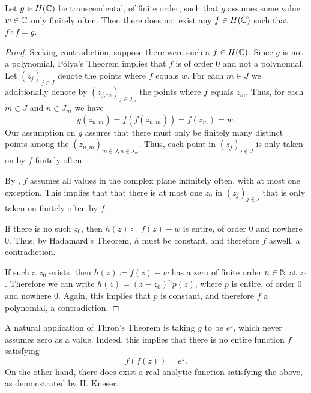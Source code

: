 \begin{theorem}[Thron] \label{thm:thron}
    Let $g \in H(\mathbb{C})$ be transcendental, of finite order, such that $g$ assumes some value $w \in \mathbb{C}$ only finitely often. Then there does not exist any $f \in H(\mathbb{C})$ such that $f \circ f = g$.
\end{theorem}

\begin{proof}
    Seeking contradiction, suppose there were such a $f \in H(\mathbb{C})$. Since $g$ is not a polynomial, Pólya's Theorem implies that $f$ is of order $0$ and not a polynomial. Let $(z_j)_{j \in J}$ denote the points where $f$ equals $w$. For each $m \in J$ we additionally denote by $(z_{j,m})_{j \in J_m}$ the points where $f$ equals $z_m$. Thus, for each $m \in J$ and $n \in J_m$ we have
    $$ g(z_{n,m}) = f(f(z_{n,m})) = f(z_m) = w. $$
    Our assumption on $g$ assures that there must only be finitely many distinct points among the $(z_{n,m})_{m \in J,n \in J_m}$. Thus, each point in $(z_j)_{j \in J}$ is only taken on by $f$ finitely often.

    By , $f$ assumes all values in the complex plane infinitely often, with at most one exception. This implies that that there is at most one $z_0$ in $(z_j)_{j \in J}$ that is only taken on finitely often by $f$.

    If there is no such $z_0$, then $h(z) \coloneqq f(z) - w$ is entire, of order $0$ and nowhere $0$. Thus, by Hadamard's Theorem, $h$ must be constant, and therefore $f$ aswell, a contradiction.

    If such a $z_0$ exists, then $h(z) \coloneqq f(z) - w$ has a zero of finite order $n \in \mathbb{N}$ at $z_0$. Therefore we can write $h(z) = (z - z_0)^n p(z)$, where $p$ is entire, of order $0$ and nowhere $0$. Again, this implies that $p$ is constant, and therefore $f$ a polynomial, a contradiction.
\end{proof}

\begin{example}
    A natural application of Thron's Theorem is taking $g$ to be $e^z$, which never assumes zero as a value. Indeed, this implies that there is no entire function $f$ satisfying
    $$ f(f(z)) = e^z. $$
    On the other hand, there does exist a real-analytic function satisfying the above, as demonstrated by H. Kneser. 
\end{example}